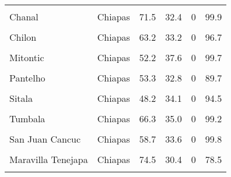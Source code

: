 \documentclass[
]{report}
\begin{document}
\begin{longtable}[t]{llrrrr}
\endfoot
\bottomrule
\endlastfoot
\cellcolor{gray!6}{Amatenango del Valle} & \cellcolor{gray!6}{Chiapas} & \cellcolor{gray!6}{67.1} & \cellcolor{gray!6}{50.0} & \cellcolor{gray!6}{0} & \cellcolor{gray!6}{90.4}\\
Chanal & Chiapas & 71.5 & 32.4 & 0 & 99.9\\
\cellcolor{gray!6}{Chenalho} & \cellcolor{gray!6}{Chiapas} & \cellcolor{gray!6}{63.0} & \cellcolor{gray!6}{39.1} & \cellcolor{gray!6}{0} & \cellcolor{gray!6}{98.8}\\
Chilon & Chiapas & 63.2 & 33.2 & 0 & 96.7\\
\cellcolor{gray!6}{Jitotol} & \cellcolor{gray!6}{Chiapas} & \cellcolor{gray!6}{72.2} & \cellcolor{gray!6}{39.1} & \cellcolor{gray!6}{0} & \cellcolor{gray!6}{78.6}\\
\addlinespace
Mitontic & Chiapas & 52.2 & 37.6 & 0 & 99.7\\
\cellcolor{gray!6}{Ocotepec} & \cellcolor{gray!6}{Chiapas} & \cellcolor{gray!6}{66.0} & \cellcolor{gray!6}{31.0} & \cellcolor{gray!6}{0} & \cellcolor{gray!6}{97.1}\\
Pantelho & Chiapas & 53.3 & 32.8 & 0 & 89.7\\
\cellcolor{gray!6}{Pueblo Nuevo Solistahuacan} & \cellcolor{gray!6}{Chiapas} & \cellcolor{gray!6}{66.7} & \cellcolor{gray!6}{40.8} & \cellcolor{gray!6}{0} & \cellcolor{gray!6}{55.0}\\
Sitala & Chiapas & 48.2 & 34.1 & 0 & 94.5\\
\addlinespace
\cellcolor{gray!6}{Tenejapa} & \cellcolor{gray!6}{Chiapas} & \cellcolor{gray!6}{74.6} & \cellcolor{gray!6}{39.7} & \cellcolor{gray!6}{0} & \cellcolor{gray!6}{99.5}\\
Tumbala & Chiapas & 66.3 & 35.0 & 0 & 99.2\\
\cellcolor{gray!6}{Zinacantan} & \cellcolor{gray!6}{Chiapas} & \cellcolor{gray!6}{52.9} & \cellcolor{gray!6}{41.9} & \cellcolor{gray!6}{0} & \cellcolor{gray!6}{99.1}\\
San Juan Cancuc & Chiapas & 58.7 & 33.6 & 0 & 99.8\\
\cellcolor{gray!6}{Aldama} & \cellcolor{gray!6}{Chiapas} & \cellcolor{gray!6}{72.6} & \cellcolor{gray!6}{33.0} & \cellcolor{gray!6}{0} & \cellcolor{gray!6}{99.4}\\
\addlinespace
Maravilla Tenejapa & Chiapas & 74.5 & 30.4 & 0 & 78.5\\
\cellcolor{gray!6}{Marques de Comillas} & \cellcolor{gray!6}{Chiapas} & \cellcolor{gray!6}{73.7} & \cellcolor{gray!6}{41.1} & \cellcolor{gray!6}{0} & \cellcolor{gray!6}{54.9}\\

\end{longtable}
\end{document}
